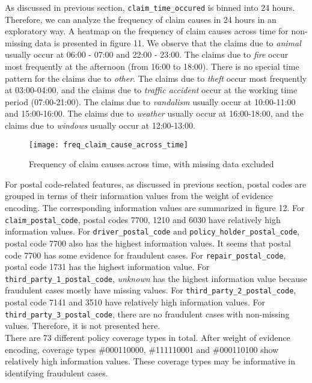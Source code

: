 \documentclass[12pt]{article}
\begin{document}
As discussed in previous section, \texttt{claim\_time\_occured} is binned into 24 hours. Therefore, we can analyze the frequency of claim causes in 24 hours in an exploratory way. A heatmap on the frequency of claim causes across time for non-missing data is presented in figure 11. We observe that the claims due to \textit{animal} usually occur at 06:00 - 07:00 and 22:00 - 23:00. The claims due to \textit{fire} occur most frequently at the afternoon (from 16:00 to 18:00). There is no special time pattern for the claims due to \textit{other}. The claims due to \textit{theft} occur most frequently at 03:00-04:00, and the claims due to \textit{traffic accident} occur at the working time period (07:00-21:00). The claims due to \textit{vandalism} usually occur at 10:00-11:00 and 15:00-16:00. The claims due to \textit{weather} usually occur at 16:00-18:00, and the claims due to \textit{windows} usually occur at 12:00-13:00.

\begin{figure}[h]
\centering
\texttt{[image: freq\_claim\_cause\_across\_time]}
\caption{Frequency of claim causes across time, with missing data excluded}
\end{figure}

For postal code-related features, as discussed in previous section, postal codes are grouped in terms of their information values from the weight of evidence encoding. The corresponding information values are summarized in figure 12. For \texttt{claim\_postal\_code}, postal codes 7700, 1210 and 6030 have relatively high information values. For \texttt{driver\_postal\_code} and \texttt{policy\_holder\_postal\_code}, postal code 7700 also has the highest information values. It seems that postal code 7700 has some evidence for fraudulent cases. For \texttt{repair\_postal\_code}, postal code 1731 has the highest information value. For \texttt{third\_party\_1\_postal\_code}, \textit{unknown} has the highest information value because fraudulent cases mostly have missing values. For \texttt{third\_party\_2\_postal\_code}, postal code 7141 and 3510 have relatively high information values. For \texttt{third\_party\_3\_postal\_code}, there are no fraudulent cases with non-missing values. Therefore, it is not presented here. \\

There are 73 different policy coverage types in total. After weight of evidence encoding, coverage types \#000110000, \#111110001 and \#000110100 show relatively high information values. These coverage types may be informative in identifying fraudulent cases.
\end{document}
